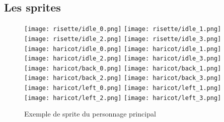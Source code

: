 \documentclass{article}
\begin{document}
\subsection{Les sprites}
\begin{figure}[h]
    \centering
    \texttt{[image: risette/idle\_0.png]}
    \texttt{[image: risette/idle\_1.png]}
    \texttt{[image: risette/idle\_2.png]}
    \texttt{[image: risette/idle\_3.png]}
    \\
    \texttt{[image: haricot/idle\_0.png]}
    \texttt{[image: haricot/idle\_1.png]}
    \texttt{[image: haricot/idle\_2.png]}
    \texttt{[image: haricot/idle\_3.png]}
    \\
    \texttt{[image: haricot/back\_0.png]}
    \texttt{[image: haricot/back\_1.png]}
    \texttt{[image: haricot/back\_2.png]}
    \texttt{[image: haricot/back\_3.png]}
    \\
    \texttt{[image: haricot/left\_0.png]}
    \texttt{[image: haricot/left\_1.png]}
    \texttt{[image: haricot/left\_2.png]}
    \texttt{[image: haricot/left\_3.png]}
    \caption{Exemple de sprite du personnage principal}\label{lapin_devant}
\end{figure}
\end{document}
